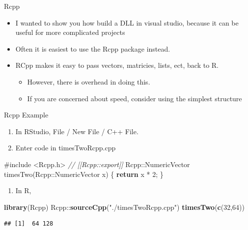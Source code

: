 \documentclass[ignorenonframetext,]{beamer}
\newenvironment{Shaded}{\begin{snugshade}}{\end{snugshade}}
\newcommand{\KeywordTok}[1]{\textcolor[rgb]{0.13,0.29,0.53}{\textbf{{#1}}}}
\newcommand{\DecValTok}[1]{\textcolor[rgb]{0.00,0.00,0.81}{{#1}}}
\newcommand{\StringTok}[1]{\textcolor[rgb]{0.31,0.60,0.02}{{#1}}}
\newcommand{\CommentTok}[1]{\textcolor[rgb]{0.56,0.35,0.01}{\textit{{#1}}}}
\newcommand{\OtherTok}[1]{\textcolor[rgb]{0.56,0.35,0.01}{{#1}}}
\newcommand{\NormalTok}[1]{{#1}}
\providecommand{\tightlist}{%
\setlength{\itemsep}{0pt}\setlength{\parskip}{0pt}}
\begin{document}
\begin{frame}{Rcpp}

\begin{itemize}
\tightlist
\item
  I wanted to show you how build a DLL in visual studio, because it can
  be useful for more complicated projects
\item
  Often it is easiest to use the Rcpp package instead.
\item
  RCpp makes it easy to pass vectors, matricies, lists, ect, back to R.

  \begin{itemize}
  \tightlist
  \item
    However, there is overhead in doing this.
  \item
    If you are concerned about speed, consider using the simplest
    structure
  \end{itemize}
\end{itemize}

\end{frame}

\begin{frame}[fragile]{Rcpp Example}

\begin{enumerate}
\def\labelenumi{\arabic{enumi}.}
\tightlist
\item
  In RStudio, File / New File / C++ File.
\item
  Enter code in timesTwoRcpp.cpp
\end{enumerate}

\begin{Shaded}
\begin{Highlighting}[]
\OtherTok{#include <Rcpp.h>}
\CommentTok{// [[Rcpp::export]]}
\NormalTok{Rcpp::NumericVector timesTwo(Rcpp::NumericVector x) \{}
  \KeywordTok{return} \NormalTok{x * }\DecValTok{2}\NormalTok{;}
\NormalTok{\}}
\end{Highlighting}
\end{Shaded}

\begin{enumerate}
\def\labelenumi{\arabic{enumi}.}
\setcounter{enumi}{2}
\tightlist
\item
  In R,
\end{enumerate}

\begin{Shaded}
\begin{Highlighting}[]
\KeywordTok{library}\NormalTok{(Rcpp)}
\NormalTok{Rcpp::}\KeywordTok{sourceCpp}\NormalTok{(}\StringTok{"./timesTwoRcpp.cpp"}\NormalTok{)}
\KeywordTok{timesTwo}\NormalTok{(}\KeywordTok{c}\NormalTok{(}\DecValTok{32}\NormalTok{,}\DecValTok{64}\NormalTok{))}
\end{Highlighting}
\end{Shaded}

\begin{verbatim}
## [1]  64 128
\end{verbatim}

\end{frame}
\end{document}
